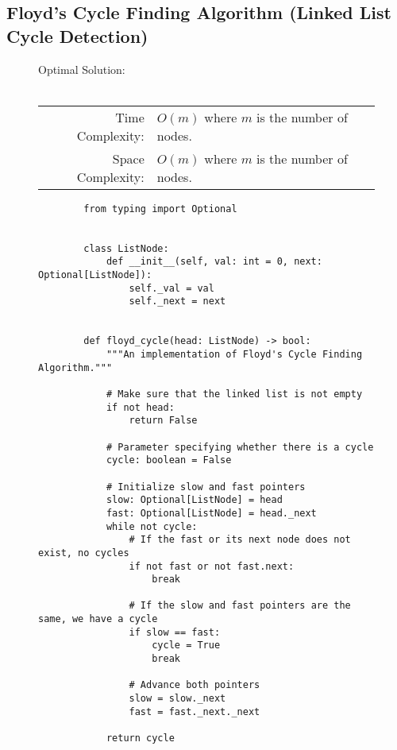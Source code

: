 
\subsection{Floyd's Cycle Finding Algorithm (Linked List Cycle Detection)}

\begin{figure}[H]
    Optimal Solution:\\\\
    \begin{tabular}{rl}
        Time Complexity:& \(O(m)\) where \(m\) is the number of nodes.\\
        Space Complexity:& \(O(m)\) where \(m\) is the number of nodes.
    \end{tabular}
\end{figure}

\begin{figure}[H]
    \centering
    \begin{verbatim}
        from typing import Optional


        class ListNode:
            def __init__(self, val: int = 0, next: Optional[ListNode]):
                self._val = val
                self._next = next


        def floyd_cycle(head: ListNode) -> bool:
            """An implementation of Floyd's Cycle Finding Algorithm."""

            # Make sure that the linked list is not empty
            if not head:
                return False

            # Parameter specifying whether there is a cycle
            cycle: boolean = False

            # Initialize slow and fast pointers
            slow: Optional[ListNode] = head
            fast: Optional[ListNode] = head._next
            while not cycle:
                # If the fast or its next node does not exist, no cycles
                if not fast or not fast.next:
                    break

                # If the slow and fast pointers are the same, we have a cycle
                if slow == fast:
                    cycle = True
                    break

                # Advance both pointers
                slow = slow._next
                fast = fast._next._next

            return cycle
    \end{verbatim}
\end{figure}
